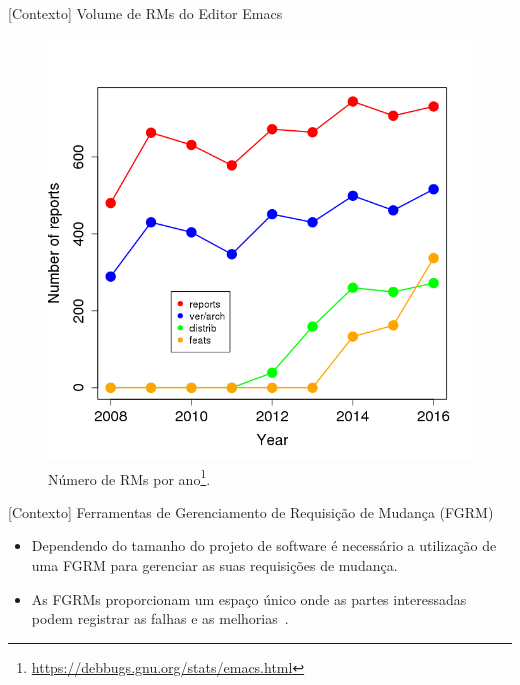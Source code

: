 \documentclass[t,14pt,mathserif]{beamer}
\begin{document}
\begin{frame}{[Contexto] Volume de RMs do Editor Emacs}
    \begin{figure}[htpb]
        \centering
        \includegraphics[width=.42\linewidth]{../img/sample.png}
\caption{Número de RMs por ano\footnote{\url{https://debbugs.gnu.org/stats/emacs.html}}.}
\label{fig:emacs_num_rm_por_ano}
    \end{figure}
\end{frame}

\begin{frame}{[Contexto] Ferramentas de Gerenciamento de Requisição de Mudança
        (FGRM)}
	\begin{itemize}
        \item Dependendo do tamanho do projeto de software é necessário a
              utilização de uma \alert{FGRM} para gerenciar as suas requisições de
              mudança.
        \item As \alert{FGRMs} proporcionam um espaço único onde as partes
              interessadas podem registrar as falhas e as
              melhorias~\cite{1407819}.
	\end{itemize}
\end{frame}
\end{document}
